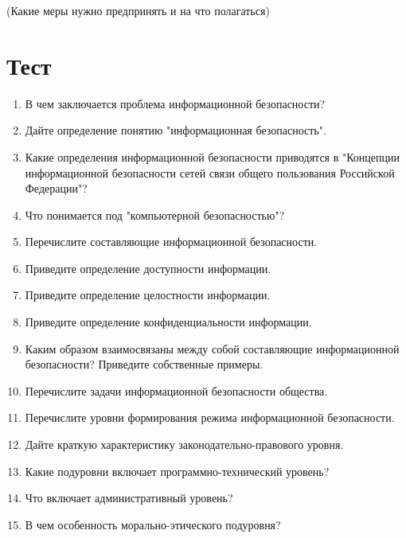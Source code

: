  (Какие меры нужно предпринять и на что
полагаться)

\section{Тест}\label{sect1_с}
%
\begin{enumerate}
  \item В чем заключается проблема информационной безопасности?
  \item Дайте определение понятию "информационная безопасность".
  \item Какие определения информационной безопасности приводятся в
      "Концепции информационной безопасности сетей связи общего пользования
      Российской Федерации"?
  \item Что понимается под "компьютерной безопасностью"?
  \item Перечислите составляющие информационной безопасности.
  \item Приведите определение доступности информации.
  \item Приведите определение целостности информации.
  \item Приведите определение конфиденциальности информации.
  \item Каким образом взаимосвязаны между собой составляющие информационной
      безопасности? Приведите собственные примеры.
  \item Перечислите задачи информационной безопасности общества.
  \item Перечислите уровни формирования режима информационной безопасности.
  \item Дайте краткую характеристику законодательно-правового уровня.
  \item Какие подуровни включает программно-технический уровень?
  \item Что включает административный уровень?
  \item В чем особенность морально-этического подуровня?
\end{enumerate}
